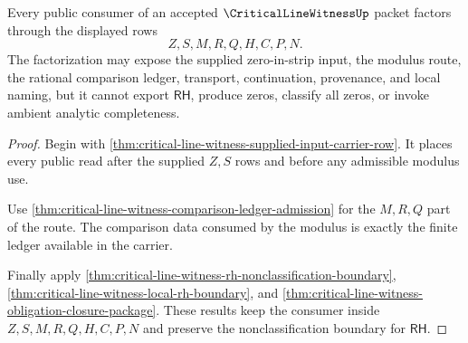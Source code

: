 \begin{theorem}
\label{thm:critical-line-witness-public-consumer-factorization}
Every public consumer of an accepted $\CriticalLineWitnessUp$ packet factors through the displayed rows
$$
Z,S,M,R,Q,H,C,P,N.
$$
The factorization may expose the supplied zero-in-strip input, the modulus route, the rational comparison ledger, transport, continuation, provenance, and local naming, but it cannot export $\mathsf{RH}$, produce zeros, classify all zeros, or invoke ambient analytic completeness.
\end{theorem}
\begin{proof}
Begin with \autoref{thm:critical-line-witness-supplied-input-carrier-row}. It places every public read after the supplied $Z,S$ rows and before any admissible modulus use.

Use \autoref{thm:critical-line-witness-comparison-ledger-admission} for the $M,R,Q$ part of the route. The comparison data consumed by the modulus is exactly the finite ledger available in the carrier.

Finally apply \autoref{thm:critical-line-witness-rh-nonclassification-boundary}, \autoref{thm:critical-line-witness-local-rh-boundary}, and \autoref{thm:critical-line-witness-obligation-closure-package}. These results keep the consumer inside $Z,S,M,R,Q,H,C,P,N$ and preserve the nonclassification boundary for $\mathsf{RH}$.
\end{proof}

